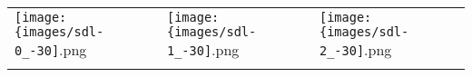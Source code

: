 \begin{tabular}{lll}
\texttt{[image: \{images/sdl-0\_-30]}.png} &\texttt{[image: \{images/sdl-1\_-30]}.png} &\texttt{[image: \{images/sdl-2\_-30]}.png} 
 \\ \hfill\end{tabular}
